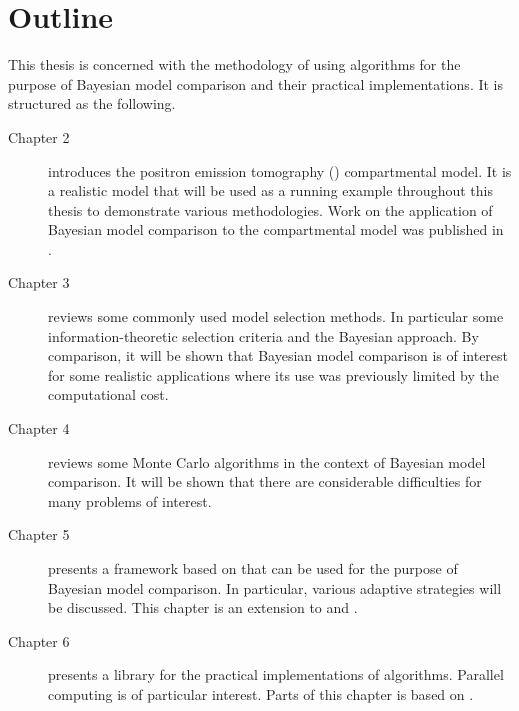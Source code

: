 \section{Outline}
\label{sec:Outline}

This thesis is concerned with the methodology of using \smc algorithms for
the purpose of Bayesian model comparison and their practical implementations.
It is structured as the following.
\begin{description}
  \item[Chapter 2] introduces the positron emission tomography (\pet)
  compartmental model. It is a realistic model that will be used as a running
  example throughout this thesis to demonstrate various methodologies. Work
  on the application of Bayesian model comparison to the \pet compartmental
  model was published in \cite{Zhou2013}.
  \item[Chapter 3] reviews some commonly used model selection methods. In
  particular some information-theoretic selection criteria and the Bayesian
  approach. By comparison, it will be shown that Bayesian model comparison is
  of interest for some realistic applications where its use was previously
  limited by the computational cost.
  \item[Chapter 4] reviews some Monte Carlo algorithms in the context of
  Bayesian model comparison. It will be shown that there are considerable
  difficulties for many problems of interest.
  \item[Chapter 5] presents a framework based on \smc that can be used for
  the purpose of Bayesian model comparison. In particular, various adaptive
  strategies will be discussed. This chapter is an extension to
  \cite{Zhou:2013vx} and \cite{Zhou:2012uz}.  
  \item[Chapter 6] presents a \cpp library for the practical implementations
  of \smc algorithms. Parallel computing is of particular interest. Parts of
  this chapter is based on \cite{vsmcjss}.
\end{description}
